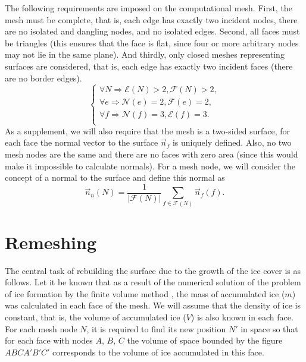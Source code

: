 \documentclass[
11pt,
tightenlines,
twoside,
onecolumn,
nofloats,
nobibnotes,
nofootinbib,
superscriptaddress,
noshowpacs,
centertags]
{revtex4}
\begin{document}
The following requirements are imposed on the computational mesh.
First, the mesh must be complete, that is, each edge has exactly two incident nodes, there are no isolated and dangling nodes, and no isolated edges.
Second, all faces must be triangles (this ensures that the face is flat, since four or more arbitrary nodes may not lie in the same plane).
And thirdly, only closed meshes representing  surfaces are
considered, that is, each edge has exactly two incident faces (there
are no border edges).
\begin{equation}\label{eq_arch}
\begin{cases}
\forall N \Rightarrow \mathscr{E}(N) > 2, \mathscr{F}(N) > 2, \\
\forall e \Rightarrow \mathscr{N}(e) = 2 , \mathscr{F}(e) = 2, \\
\forall f \Rightarrow \mathscr{N}(f) = 3 , \mathscr{E}(f) = 3. \\
\end{cases}
\end{equation}
As a supplement, we will also require that the mesh is a two-sided surface, for each face the normal vector to the surface $\vec{n}_f$ is uniquely defined.
Also, no two mesh nodes are the same and there are no faces with zero area (since this would make it impossible to calculate normals).
For a mesh node, we will consider the concept of a normal to the surface and define this normal as
\begin{equation*}
\vec{n}_n(N) = \frac{1}{|\mathscr{F}(N)|} \sum_{f \in
\mathscr{F}(N)}{\vec{n}_f(f)}.
\end{equation*}


\section{Remeshing}

The central task of rebuilding the surface due to the growth of the ice cover is as follows.
Let it be known that as a result of the numerical solution of the problem of ice formation by the finite volume method \cite{Beaugendre}, the mass of accumulated ice ($m$) was calculated in each face of the mesh.
We will assume that the density of ice is constant, that is, the volume of accumulated ice ($V$) is also known in each face.
For each mesh node $N$, it is required to find its new position $N'$ in space so that for each face with nodes $A$, $B$, $C$ the volume of space bounded by the figure $ABCA'B'C'$ corresponds to the volume of ice accumulated in this face.
\end{document}
